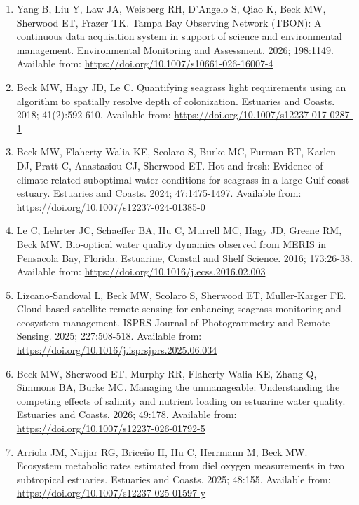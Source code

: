 \documentclass[letterpaper,11pt]{article}
\begin{document}
\begin{enumerate}[leftmargin=1.8em,itemsep=6pt,topsep=2pt]

\item Yang B, Liu Y, Law JA, Weisberg RH, D'Angelo S, Qiao K, Beck MW, Sherwood ET, Frazer TK. Tampa Bay Observing Network (TBON): A continuous data acquisition system in support of science and environmental management. Environmental Monitoring and Assessment. 2026; 198:1149. Available from: \url{https://doi.org/10.1007/s10661-026-16007-4}

\item Beck MW, Hagy JD, Le C. Quantifying seagrass light requirements using an algorithm to spatially resolve depth of colonization. Estuaries and Coasts. 2018; 41(2):592-610. Available from: \url{https://doi.org/10.1007/s12237-017-0287-1}

\item Beck MW, Flaherty-Walia KE, Scolaro S, Burke MC, Furman BT, Karlen DJ, Pratt C, Anastasiou CJ, Sherwood ET. Hot and fresh: Evidence of climate-related suboptimal water conditions for seagrass in a large Gulf coast estuary. Estuaries and Coasts. 2024; 47:1475-1497. Available from: \url{https://doi.org/10.1007/s12237-024-01385-0}

\item Le C, Lehrter JC, Schaeffer BA, Hu C, Murrell MC, Hagy JD, Greene RM, Beck MW. Bio-optical water quality dynamics observed from MERIS in Pensacola Bay, Florida. Estuarine, Coastal and Shelf Science. 2016; 173:26-38. Available from: \url{https://doi.org/10.1016/j.ecss.2016.02.003}

\item Lizcano-Sandoval L, Beck MW, Scolaro S, Sherwood ET, Muller-Karger FE. Cloud-based satellite remote sensing for enhancing seagrass monitoring and ecosystem management. ISPRS Journal of Photogrammetry and Remote Sensing. 2025; 227:508-518. Available from: \url{https://doi.org/10.1016/j.isprsjprs.2025.06.034}

\item Beck MW, Sherwood ET, Murphy RR, Flaherty-Walia KE, Zhang Q, Simmons BA, Burke MC. Managing the unmanageable: Understanding the competing effects of salinity and nutrient loading on estuarine water quality. Estuaries and Coasts. 2026; 49:178. Available from: \url{https://doi.org/10.1007/s12237-026-01792-5}

\item Arriola JM, Najjar RG, Brice\~{n}o H, Hu C, Herrmann M, Beck MW. Ecosystem metabolic rates estimated from diel oxygen measurements in two subtropical estuaries. Estuaries and Coasts. 2025; 48:155. Available from: \url{https://doi.org/10.1007/s12237-025-01597-y}


\end{enumerate}
\end{document}
